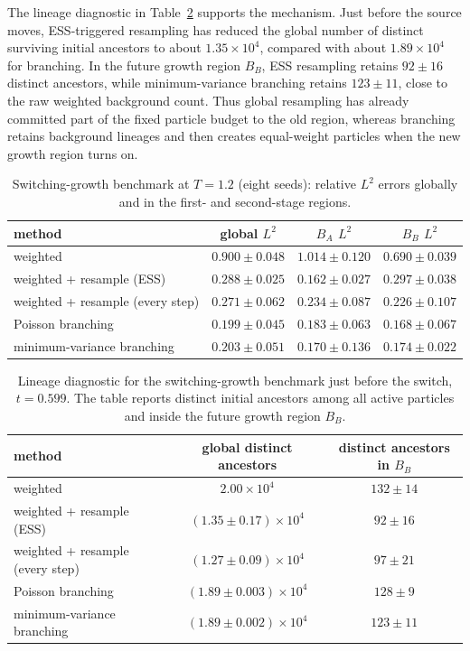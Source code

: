 The lineage diagnostic in Table~\ref{tab:switch_anc} supports the mechanism.  Just
before the source moves, ESS-triggered resampling has reduced the global number of
distinct surviving initial ancestors to about \(1.35\times10^4\), compared with about
\(1.89\times10^4\) for branching.  In the future growth region \(B_B\), ESS resampling
retains \(92\pm16\) distinct ancestors, while minimum-variance branching retains
\(123\pm11\), close to the raw weighted background count.  Thus global resampling has
already committed part of the fixed particle budget to the old region, whereas branching
retains background lineages and then creates equal-weight particles when the new growth
region turns on.

\begin{table}[t]
\centering
\caption{Switching-growth benchmark at \(T=1.2\) (eight seeds): relative \(L^2\) errors globally and in the first- and second-stage regions.}
\label{tab:switch}
\begin{tabular}{l c c c }
\toprule
method & global \(L^2\) & \(B_A\) \(L^2\) & \(B_B\) \(L^2\)   \\
\midrule
weighted & \(0.900\pm0.048\) & \(1.014\pm0.120\) & \(0.690\pm0.039\)  \\
weighted + resample (ESS) & \(0.288\pm0.025\) & \(\mathbf{0.162\pm0.027}\) & \(0.297\pm0.038\) \\
weighted + resample (every step) & \(0.271\pm0.062\) & \(0.234\pm0.087\) & \(0.226\pm0.107\)  \\
Poisson branching & \(\mathbf{0.199\pm0.045}\) & \(0.183\pm0.063\) & \(\mathbf{0.168\pm0.067}\)  \\
minimum-variance branching & \(0.203\pm0.051\) & \(0.170\pm0.136\) & \(0.174\pm0.022\)   \\
\bottomrule
\end{tabular}
\end{table}

\begin{table}[t]
\centering
\caption{Lineage diagnostic for the switching-growth benchmark just before the switch,
\(t=0.599\).  The table reports distinct initial ancestors among all active particles
and inside the future growth region \(B_B\).}
\label{tab:switch_anc}
\begin{tabular}{l c c}
\toprule
method & global distinct ancestors & distinct ancestors in \(B_B\) \\
\midrule
weighted & \(2.00\times10^4\) & \(132\pm14\) \\
weighted + resample (ESS) & \((1.35\pm0.17)\times10^4\) & \(92\pm16\) \\
weighted + resample (every step) & \((1.27\pm0.09)\times10^4\) & \(97\pm21\) \\
Poisson branching & \((1.89\pm0.003)\times10^4\) & \(128\pm9\) \\
minimum-variance branching & \((1.89\pm0.002)\times10^4\) & \(123\pm11\) \\
\bottomrule
\end{tabular}
\end{table}

